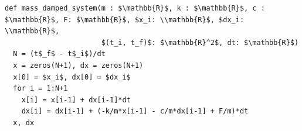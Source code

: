 \documentclass[border=10pt]{standalone}
\begin{document}
\begin{lstlisting}
def mass_damped_system(m : $\mathbb{R}$, k : $\mathbb{R}$, c : $\mathbb{R}$, F: $\mathbb{R}$, $x_i: \\mathbb{R}$, $dx_i: \\mathbb{R}$, 
                       $(t_i, t_f)$: $\mathbb{R}^2$, dt: $\mathbb{R}$)
  N = (t$_f$ - t$_i$)/dt
  x = zeros(N+1), dx = zeros(N+1)
  x[0] = $x_i$, dx[0] = $dx_i$
  for i = 1:N+1
    x[i] = x[i-1] + dx[i-1]*dt
    dx[i] = dx[i-1] + (-k/m*x[i-1] - c/m*dx[i-1] + F/m)*dt
  x, dx
\end{lstlisting}
\end{document}
